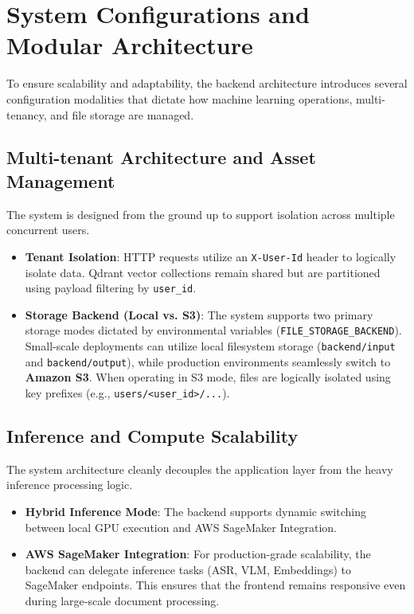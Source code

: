 \section{System Configurations and Modular Architecture}

To ensure scalability and adaptability, the backend architecture introduces several configuration modalities that dictate how machine learning operations, multi-tenancy, and file storage are managed.

\subsection{Multi-tenant Architecture and Asset Management}
The system is designed from the ground up to support isolation across multiple concurrent users.
\begin{itemize}
    \item \textbf{Tenant Isolation}: HTTP requests utilize an \texttt{X-User-Id} header to logically isolate data. Qdrant vector collections remain shared but are partitioned using payload filtering by \texttt{user\_id}.
    \item \textbf{Storage Backend (Local vs. S3)}: The system supports two primary storage modes dictated by environmental variables (\texttt{FILE\_STORAGE\_BACKEND}). Small-scale deployments can utilize local filesystem storage (\texttt{backend/input} and \texttt{backend/output}), while production environments seamlessly switch to \textbf{Amazon S3}. When operating in S3 mode, files are logically isolated using key prefixes (e.g., \texttt{users/<user\_id>/...}).
\end{itemize}

\subsection{Inference and Compute Scalability}
The system architecture cleanly decouples the application layer from the heavy inference processing logic.
\begin{itemize}
    \item \textbf{Hybrid Inference Mode}: The backend supports dynamic switching between local GPU execution and AWS SageMaker Integration.
    \item \textbf{AWS SageMaker Integration}: For production-grade scalability, the backend can delegate inference tasks (ASR, VLM, Embeddings) to SageMaker endpoints. This ensures that the frontend remains responsive even during large-scale document processing.
\end{itemize}

